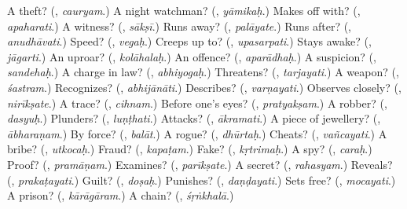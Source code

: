 \begin{tcolorbox}[breakable,colback=teal!4,colframe=teal!35!black,title={Before you move on}]
A theft? (\textbf{}, \emph{cauryam}.) A night watchman? (\textbf{}, \emph{yāmikaḥ}.) Makes off with? (\textbf{}, \emph{apaharati}.) A witness? (\textbf{}, \emph{sākṣī}.) Runs away? (\textbf{}, \emph{palāyate}.) Runs after? (\textbf{}, \emph{anudhāvati}.) Speed? (\textbf{}, \emph{vegaḥ}.) Creeps up to? (\textbf{}, \emph{upasarpati}.) Stays awake? (\textbf{}, \emph{jāgarti}.) An uproar? (\textbf{}, \emph{kolāhalaḥ}.) An offence? (\textbf{}, \emph{aparādhaḥ}.) A suspicion? (\textbf{}, \emph{sandehaḥ}.) A charge in law? (\textbf{}, \emph{abhiyogaḥ}.) Threatens? (\textbf{}, \emph{tarjayati}.) A weapon? (\textbf{}, \emph{śastram}.) Recognizes? (\textbf{}, \emph{abhijānāti}.) Describes? (\textbf{}, \emph{varṇayati}.) Observes closely? (\textbf{}, \emph{nirīkṣate}.) A trace? (\textbf{}, \emph{cihnam}.) Before one's eyes? (\textbf{}, \emph{pratyakṣam}.) A robber? (\textbf{}, \emph{dasyuḥ}.) Plunders? (\textbf{}, \emph{luṇṭhati}.) Attacks? (\textbf{}, \emph{ākramati}.) A piece of jewellery? (\textbf{}, \emph{ābharaṇam}.) By force? (\textbf{}, \emph{balāt}.) A rogue? (\textbf{}, \emph{dhūrtaḥ}.) Cheats? (\textbf{}, \emph{vañcayati}.) A bribe? (\textbf{}, \emph{utkocaḥ}.) Fraud? (\textbf{}, \emph{kapaṭam}.) Fake? (\textbf{}, \emph{kṛtrimaḥ}.) A spy? (\textbf{}, \emph{caraḥ}.) Proof? (\textbf{}, \emph{pramāṇam}.) Examines? (\textbf{}, \emph{parīkṣate}.) A secret? (\textbf{}, \emph{rahasyam}.) Reveals? (\textbf{}, \emph{prakaṭayati}.) Guilt? (\textbf{}, \emph{doṣaḥ}.) Punishes? (\textbf{}, \emph{daṇḍayati}.) Sets free? (\textbf{}, \emph{mocayati}.) A prison? (\textbf{}, \emph{kārāgāram}.) A chain? (\textbf{}, \emph{śṛṅkhalā}.)
\end{tcolorbox}
